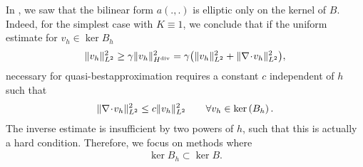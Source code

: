 \begin{intro}
  In , we saw that the
  bilinear form $a(.,.)$ is elliptic only on the kernel of
  $B$. Indeed, for the simplest case with $K\equiv 1$, we conclude
  that if the uniform estimate for $v_h\in \ker{B_h}$
  \begin{gather*}
    \lVert v_h\rVert^2_{L^2}
    \ge \gamma \lVert v_h\rVert^2_{H^{\text{div}}}
    = \gamma \bigl(\lVert v_h\rVert^2_{L^2} + \lVert\nabla\!\cdot\! v_h\rVert^2_{L^2}\bigr),
  \end{gather*}
  necessary for quasi-bestapproximation requires a constant $c$
  independent of $h$ such that
  \begin{gather*}
    \lVert\nabla\!\cdot\! v_h\rVert^2_{L^2} \le c \lVert v_h\rVert^2_{L^2}
    \qquad\forall v_h\in\operatorname{ker}\left(B_h\right).
  \end{gather*}
  The inverse estimate is insufficient by two powers of $h$, such that
  this is actually a hard condition. Therefore, we focus on
  methods where
  \begin{gather}
    \label{eq:darcy:16}
    \ker{B_h} \subset \ker B.
  \end{gather}
\end{intro}

